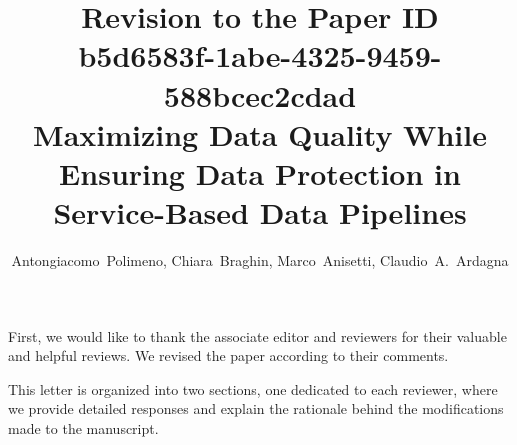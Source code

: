 \documentclass{article}
\begin{document}


\newcommand{\customTheoremBlock}[2]{\begin{adjustwidth}{25pt}{25pt}\textbf{\emph{#1}} #2\end{adjustwidth}}
\newcommand{\customFigCaption}[2]{{\footnotesize Fig. #1.~#2}}
\newcommand{\customSecName}[2]{{\large \textbf{#1~#2}}}
\newcommand{\customTableCaption}[2]{{\centering TABLE~#1 #2}}

\title{\large \textbf{Revision to the Paper ID b5d6583f-1abe-4325-9459-588bcec2cdad\\Maximizing Data Quality While Ensuring Data
Protection in Service-Based Data Pipelines\\}}

\author{Antongiacomo~Polimeno, Chiara~Braghin, Marco~Anisetti, Claudio~A.~Ardagna}

\date{}

\maketitle

First, we would like to thank the associate editor and reviewers for their valuable and helpful reviews. We revised the paper according to their comments.

This letter is organized into two sections, one dedicated to each reviewer, where we provide detailed responses and explain the rationale behind the modifications made to the manuscript.


\newpage

\vspace{.4cm}



\newpage
\vspace{.4cm}




\newpage
\vspace{.4cm}




\newpage
\vspace{.4cm}

\end{document}
